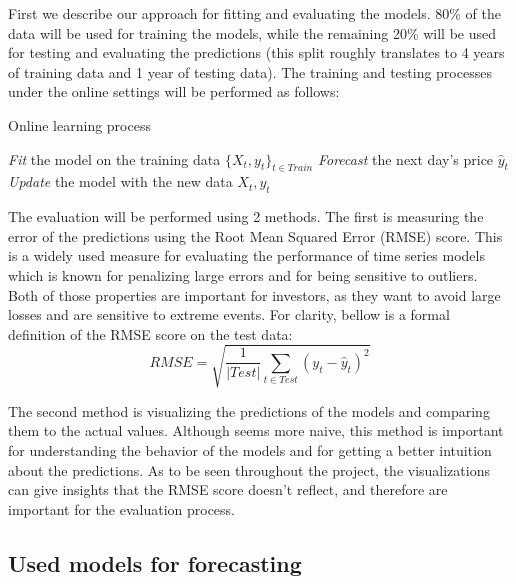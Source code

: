 \documentclass[12pt]{article}
\theoremstyle{definition}
\begin{document}
First we describe our approach for fitting and evaluating the models.
80\% of the data will be used for training the models, while the remaining 20\% will be used for testing and evaluating the predictions (this split roughly translates to 4 years of training data and 1 year of testing data).
The training and testing processes under the online settings will be performed as follows:

\begin{algorithm}[H]
  \caption{Online learning process}
  \begin{algorithmic}
    \State \textit{Fit} the model on the training data $\{ X_t, y_t \}_{t \in Train}$  
      \State \textit{Forecast} the next day's price $\hat{y}_t$  
      \State \textit{Update} the model with the new data $X_t, y_t$  
    \EndFor
  \end{algorithmic}
  \label{alg: online learning process}
\end{algorithm}

The evaluation will be performed using 2 methods. 
The first is measuring the error of the predictions using the Root Mean Squared Error (RMSE) score. 
This is a widely used measure for evaluating the performance of time series models which is known for penalizing large errors and for being sensitive to outliers. 
Both of those properties are important for investors, as they want to avoid large losses and are sensitive to extreme events.
For clarity, bellow is a formal definition of the RMSE score on the test data:
\[
  RMSE = \sqrt{\frac{1}{|Test|} \sum_{t \in Test} (y_t - \hat{y}_t)^2}
\]

The second method is visualizing the predictions of the models and comparing them to the actual values.
Although seems more naive, this method is important for understanding the behavior of the models and for getting a better intuition about the predictions.
As to be seen throughout the project, the visualizations can give insights that the RMSE score doesn't reflect, and therefore are important for the evaluation process.

\subsection{Used models for forecasting}
\end{document}

